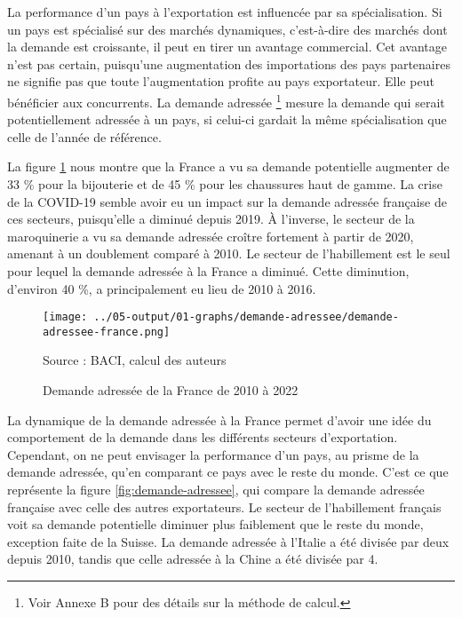 \documentclass[french,10pt,a4paper]{article}
\begin{document}

La performance d'un pays à l'exportation est influencée par sa spécialisation. Si un pays est spécialisé sur des marchés dynamiques, c'est-à-dire des marchés dont la demande est croissante, il peut en tirer un avantage commercial. Cet avantage n'est pas certain, puisqu'une augmentation des importations des pays partenaires ne signifie pas que toute l'augmentation profite au pays exportateur. Elle peut bénéficier aux concurrents. La demande adressée \footnote{Voir Annexe B pour des détails sur la méthode de calcul.} mesure la demande qui serait potentiellement adressée à un pays, si celui-ci gardait la même spécialisation que celle de l'année de référence.

La figure \ref{fig:demande-adressee-france} nous montre que la France a vu sa demande potentielle augmenter de 33 \% pour la bijouterie et de 45 \% pour les chaussures haut de gamme. La crise de la COVID-19 semble avoir eu un impact sur la demande adressée française de ces secteurs, puisqu'elle a diminué depuis 2019. À l'inverse, le secteur de la maroquinerie a vu sa demande adressée croître fortement à partir de 2020, amenant à un doublement comparé à 2010. Le secteur de l'habillement est le seul pour lequel la demande adressée à la France a diminué. Cette diminution, d'environ 40 \%, a principalement eu lieu de 2010 à 2016.

\begin{figure}[!h]
  \centering  \texttt{[image: ../05-output/01-graphs/demande-adressee/demande-adressee-france.png]}
  \captionsetup{justification=raggedright,singlelinecheck=false, font=small}
  \caption*{Source : BACI, calcul des auteurs}
  \captionsetup{justification=centering, singlelinecheck=true, font=normalsize}
  \caption{Demande adressée de la France de 2010 à 2022}
  \label{fig:demande-adressee-france}
\end{figure}

La dynamique de la demande adressée à la France permet d'avoir une idée du comportement de la demande dans les différents secteurs d'exportation. Cependant, on ne peut envisager la performance d'un pays, au prisme de la demande adressée, qu'en comparant ce pays avec le reste du monde. C'est ce que représente la figure \ref{fig:demande-adressee}, qui compare la demande adressée française avec celle des autres exportateurs. Le secteur de l'habillement français voit sa demande potentielle diminuer plus faiblement que le reste du monde, exception faite de la Suisse. La demande adressée à l'Italie a été divisée par deux depuis 2010, tandis que celle adressée à la Chine a été divisée par 4.
\end{document}
